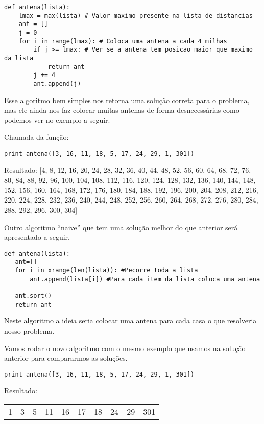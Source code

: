 \documentclass[11pt]{article}
\begin{document}
\begin{verbatim}
def antena(lista):
    lmax = max(lista) # Valor maximo presente na lista de distancias
    ant = []
    j = 0
    for i in range(lmax): # Coloca uma antena a cada 4 milhas
        if j >= lmax: # Ver se a antena tem posicao maior que maximo da lista
            return ant
        j += 4
        ant.append(j)
\end{verbatim}

Esse algoritmo bem simples nos retorna uma solução correta para o
problema, mas ele ainda nos faz colocar muitas antenas de forma
desnecessárias como podemos ver no exemplo a seguir.

Chamada da função:
\begin{verbatim}
print antena([3, 16, 11, 18, 5, 17, 24, 29, 1, 301])
\end{verbatim}

Resultado:
[4, 8, 12, 16, 20, 24, 28, 32, 36, 40, 44, 48, 52, 56, 60, 64, 68, 72, 76, 80, 84, 88, 92, 96, 100, 104, 108, 112, 116, 120, 124, 128, 132, 136, 140, 144, 148, 152, 156, 160, 164, 168, 172, 176, 180, 184, 188, 192, 196, 200, 204, 208, 212, 216, 220, 224, 228, 232, 236, 240, 244, 248, 252, 256, 260, 264, 268, 272, 276, 280, 284, 288, 292, 296, 300, 304]

Outro algoritmo ``naive'' que tem uma solução melhor do que anterior será apresentado a seguir.

\begin{verbatim}
def antena(lista):
   ant=[]
   for i in xrange(len(lista)): #Pecorre toda a lista
       ant.append(lista[i]) #Para cada item da lista coloca uma antena

   ant.sort()
   return ant
\end{verbatim}

Neste algoritmo a ideia seria colocar uma antena para cada casa o que
resolveria nosso problema.

Vamos rodar o novo algoritmo com o mesmo exemplo que usamos na solução
anterior para compararmos as soluções.

\begin{verbatim}
print antena([3, 16, 11, 18, 5, 17, 24, 29, 1, 301])
\end{verbatim}

Resultado:
\begin{center}
\begin{tabular}{rrrrrrrrrr}
1 & 3 & 5 & 11 & 16 & 17 & 18 & 24 & 29 & 301\\
\end{tabular}
\end{center}
\end{document}
